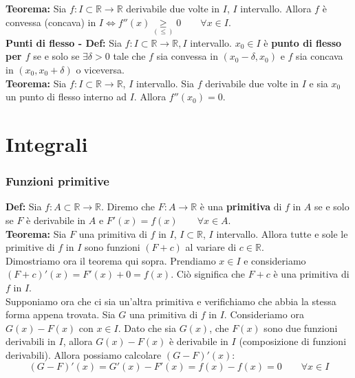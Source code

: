 \documentclass{article}
\begin{document}
\noindent\textbf{Teorema:} Sia $f: I \subset \mathbb{R} \xrightarrow{} \mathbb{R}$ derivabile due volte in $I$, $I$ intervallo. Allora $f$ è convessa (concava) in $I \iff f''(x) \underset{(\leq)}{\geq} 0 \qquad \forall x \in I$. \\

\noindent\textbf{Punti di flesso - Def:} Sia $f: I \subset \mathbb{R} \xrightarrow{} \mathbb{R}, I$ intervallo. $x_0 \in I$ è \textbf{punto di flesso per $f$} se e solo se $\exists \delta > 0$ tale che $f$ sia convessa in $(x_0 - \delta, x_0)$ e $f$ sia concava in $(x_0, x_0 + \delta)$ o viceversa.\\

\noindent\textbf{Teorema:} Sia $f: I \subset \mathbb{R} \xrightarrow{} \mathbb{R}$, $I$ intervallo. Sia $f$ derivabile due volte in $I$ e sia $x_0$ un punto di flesso interno ad $I$. Allora $f''(x_0) = 0$.

\newpage
\part{Integrali}
\section{Funzioni primitive}
\textbf{Def:} Sia $f: A \subset \mathbb{R} \xrightarrow{} \mathbb{R}$. Diremo che $F: A \xrightarrow{} \mathbb{R}$ è una \textbf{primitiva} di $f$ in $A$ se e solo se $F$ è derivabile in $A$ e $F'(x) = f(x) \qquad \forall x \in A$.\\

\noindent\textbf{Teorema:} Sia $F$ una primitiva di $f$ in $I$, $I \subset \mathbb{R}$, $I$ intervallo. Allora tutte e sole le primitive di $f$ in $I$ sono funzioni $(F + c)$ al variare di $c \in \mathbb{R}$.\\

\noindent Dimostriamo ora il teorema qui sopra. Prendiamo $x \in I$ e consideriamo $(F + c)'(x) = F'(x) + 0 = f(x)$. Ciò significa che $F + c$ è una primitiva di $f$ in $I$.\\
Supponiamo ora che ci sia un'altra primitiva e verifichiamo che abbia la stessa forma appena trovata. Sia $G$ una primitiva di $f$ in $I$. Consideriamo ora $G(x) - F(x)$ con $x \in I$. Dato che sia $G(x)$, che $F(x)$ sono due funzioni derivabili in $I$, allora $G(x) - F(x)$ è derivabile in $I$ (composizione di funzioni derivabili). Allora possiamo calcolare $(G - F)'(x)$:
\begin{equation*}
    (G - F)'(x) = G'(x) - F'(x) = f(x) - f(x) = 0 \qquad \forall x \in I
\end{equation*}
\end{document}
